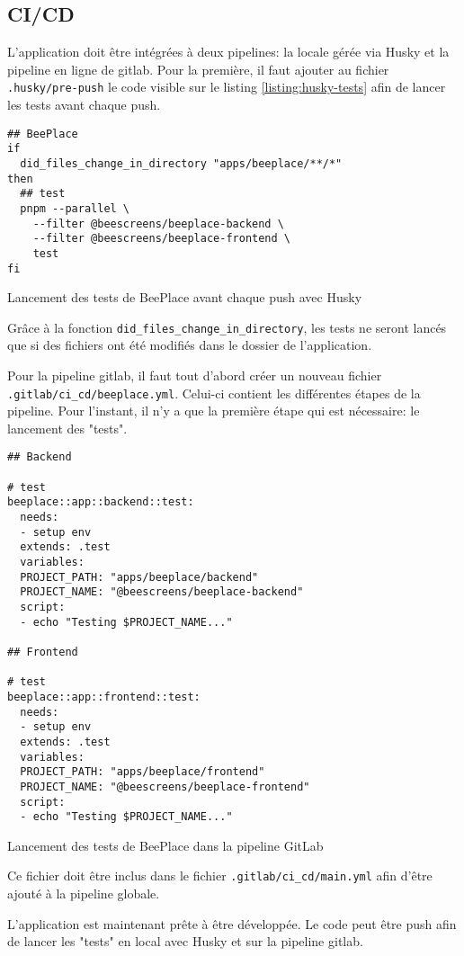 \subsection{CI/CD}

L'application doit être intégrées à deux pipelines: la locale gérée via Husky et la pipeline en ligne de \gls{gitlab}. Pour la première, il faut ajouter au fichier \texttt{.husky/pre-push} le code visible sur le listing \ref{listing:husky-tests} afin de lancer les tests avant chaque push.

\begin{listing}[h]
  \begin{verbatim}
## BeePlace
if
  did_files_change_in_directory "apps/beeplace/**/*"
then
  ## test
  pnpm --parallel \
    --filter @beescreens/beeplace-backend \
    --filter @beescreens/beeplace-frontend \
    test
fi
\end{verbatim}
  \caption{Lancement des tests de BeePlace avant chaque push avec Husky}
  \label{listing:husky-tests}
\end{listing}

Grâce à la fonction \texttt{did_files_change_in_directory}, les tests ne seront lancés que si des fichiers ont été modifiés dans le dossier de l'application.

Pour la pipeline \gls{gitlab}, il faut tout d'abord créer un nouveau fichier \texttt{.gitlab/ci_cd/beeplace.yml}. Celui-ci contient les différentes étapes de la pipeline. Pour l'instant, il n'y a que la première étape qui est nécessaire: le lancement des "tests".

\begin{listing}[h]
  \begin{verbatim}
## Backend

# test
beeplace::app::backend::test:
  needs:
  - setup env
  extends: .test
  variables:
  PROJECT_PATH: "apps/beeplace/backend"
  PROJECT_NAME: "@beescreens/beeplace-backend"
  script:
  - echo "Testing $PROJECT_NAME..."

## Frontend

# test
beeplace::app::frontend::test:
  needs:
  - setup env
  extends: .test
  variables:
  PROJECT_PATH: "apps/beeplace/frontend"
  PROJECT_NAME: "@beescreens/beeplace-frontend"
  script:
  - echo "Testing $PROJECT_NAME..."
\end{verbatim}
  \caption{Lancement des tests de BeePlace dans la pipeline GitLab}
  \label{listing:gitlab-beeplace-tests}
\end{listing}

Ce fichier doit être inclus dans le fichier \texttt{.gitlab/ci_cd/main.yml} afin d'être ajouté à la pipeline globale.

L'application est maintenant prête à être développée. Le code peut être push afin de lancer les "tests" en local avec Husky et sur la pipeline \gls{gitlab}.